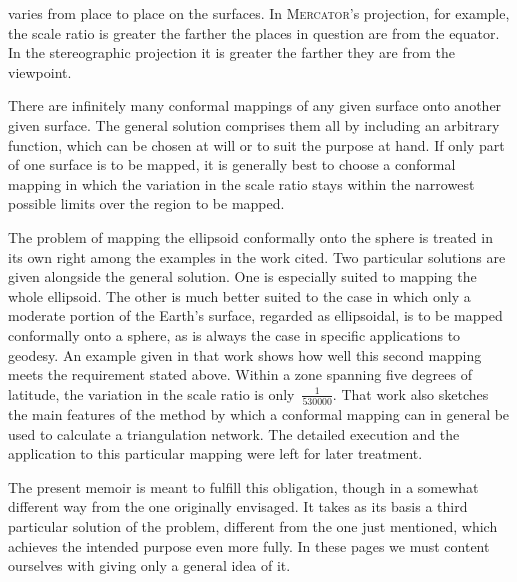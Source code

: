 %
varies from place to place on the surfaces. In \textsc{Mercator}'s projection, for example, the scale ratio is greater the farther the places in question are from the equator. In the stereographic projection it is greater the farther they are from the viewpoint.

There are infinitely many conformal mappings of any given surface onto another given surface. The general solution comprises them all by including an arbitrary function, which can be chosen at will or to suit the purpose at hand. If only part of one surface is to be mapped, it is generally best to choose a conformal mapping in which the variation in the scale ratio stays within the narrowest possible limits over the region to be mapped.

The problem of mapping the ellipsoid conformally onto the sphere is treated in its own right among the examples in the work cited. Two particular solutions are given alongside the general solution. One is especially suited to mapping the whole ellipsoid. The other is much better suited to the case in which only a moderate portion of the Earth's surface, regarded as ellipsoidal, is to be mapped conformally onto a sphere, as is always the case in specific applications to geodesy. An example given in that work shows how well this second mapping meets the requirement stated above. Within a zone spanning five degrees of latitude, the variation in the scale ratio is only~\(\frac1{530000}\). That work also sketches the main features of the method by which a conformal mapping can in general be used to calculate a triangulation network. The detailed execution and the application to this particular mapping were left for later treatment.

The present memoir is meant to fulfill this obligation, though in a somewhat different way from the one originally envisaged. It takes as its basis a third particular solution of the problem, different from the one just mentioned, which achieves the intended purpose even more fully. In these pages we must content ourselves with giving only a general idea of it.
